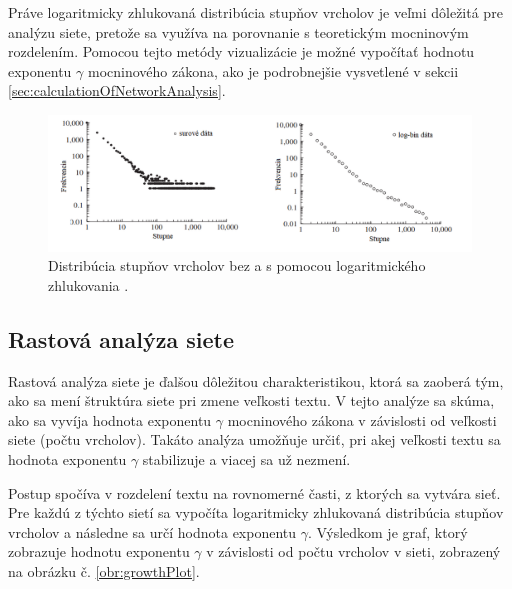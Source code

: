 Práve logaritmicky zhlukovaná distribúcia stupňov vrcholov je veľmi dôležitá pre analýzu siete, pretože sa využíva na porovnanie
s teoretickým mocninovým rozdelením. Pomocou tejto metódy vizualizácie je možné vypočítať hodnotu exponentu $\gamma$ mocninového zákona,
ako je podrobnejšie vysvetlené v sekcii \ref{sec:calculationOfNetworkAnalysis}.

\clearpage

\begin{figure}
    \centerline{\includegraphics[width=1\textwidth]{images/rawLogBinnedDegDist.png}}
    \caption[Distribúcia stupňov vrcholov bez a s pomocou logaritmického zhlukovania.]{Distribúcia stupňov vrcholov bez a s pomocou logaritmického zhlukovania \cite{Milojevi__2010}.}
    \label{obr:rawLogBinnedDegDist}
\end{figure}

\subsection{Rastová analýza siete}\label{sec:growthAnalysis}

Rastová analýza siete je ďalšou dôležitou charakteristikou, ktorá sa zaoberá tým, ako sa mení štruktúra siete pri zmene veľkosti textu. V tejto analýze
sa skúma, ako sa vyvíja hodnota exponentu $\gamma$ mocninového zákona v závislosti od veľkosti siete (počtu vrcholov). 
Takáto analýza umožňuje určiť, pri akej veľkosti textu sa hodnota exponentu $\gamma$ stabilizuje a viacej sa už nezmení.

Postup spočíva v rozdelení textu na rovnomerné časti, z ktorých sa vytvára sieť. Pre každú z týchto sietí sa vypočíta logaritmicky zhlukovaná distribúcia stupňov vrcholov
a následne sa určí hodnota exponentu $\gamma$. Výsledkom je graf, ktorý zobrazuje hodnotu exponentu $\gamma$ v závislosti od počtu vrcholov v sieti, zobrazený na obrázku č. \ref{obr:growthPlot}.


